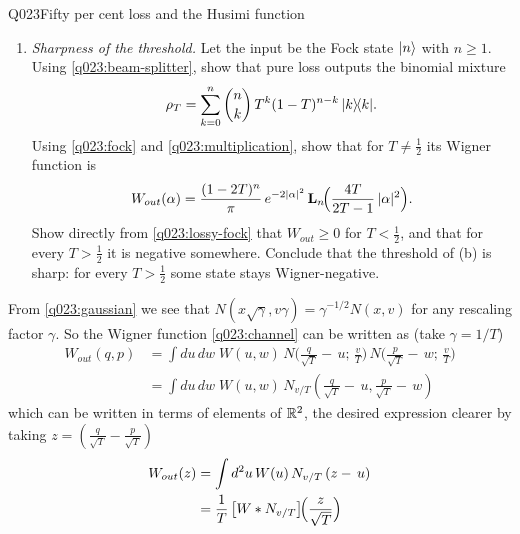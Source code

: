 \begin{entry}{Q023}{Fifty per cent loss and the Husimi function}
\begin{problem}
\begin{enumerate}[label=\textbf{(\alph*)},leftmargin=*]
  \item \emph{Sharpness of the threshold.} Let the input be the Fock state $\lvert n \rangle$ with
        $n\ge1$. Using \eqref{q023:beam-splitter}, show that pure loss outputs the
        binomial mixture
        \begin{equation}
          \rho_T=\sum_{k=0}^{n}\binom nk\,T^{k}(1-T)^{n-k}\,\lvert k \rangle\!\langle k \rvert .
          \label{q023:binomial}
        \end{equation}
        Using \eqref{q023:fock} and \eqref{q023:multiplication}, show that for
        $T\neq\tfrac12$ its Wigner function is
        \begin{equation}
          W_{ out}(\alpha)=\frac{(1-2T)^{n}}{\pi}\,e^{-2|\alpha|^{2}}\,
          \mathbf L_{n}\!\Bigl(\frac{4T}{2T-1}\,|\alpha|^{2}\Bigr).
          \label{q023:lossy-fock}
        \end{equation}
        Show directly from \eqref{q023:lossy-fock} that $W_{ out}\ge0$ for
        $T<\tfrac12$, and that for every $T>\tfrac12$ it is negative somewhere. Conclude
        that the threshold of (b) is sharp: for every $T>\tfrac12$ some state stays
        Wigner-negative.

  
\end{enumerate}
\end{problem}


\begin{solution}[Part (a)]
From \eqref{q023:gaussian} we see that $N(x\sqrt{\gamma},v\gamma)=\gamma^{-1/2}N(x,v)$ for any rescaling factor $\gamma$. So the Wigner function \eqref{q023:channel} can be written as (take $\gamma=1/T$)
\begin{equation}
\begin{split}
     W_{ out}(q,p)&=\int du\,dw\;W(u,w)\,N\bigl(\frac{q}{\sqrt{T}}-\,u;\,\frac{v}{T}\bigr)\,N\bigl(\frac{p}{\sqrt{T}}-\,w;\,\frac{v}{T}\bigr)\\
     &=\int du\,dw\;W(u,w)\,N_{v/T}\left( \frac{q}{\sqrt{T}}-\,u, \frac{p}{\sqrt{T}}-\,w\right)
\end{split}
\end{equation}
which can be written in terms of elements of $\mathbb{R}^2$, the desired expression clearer by taking $z=\left(\frac{q}{\sqrt{T}}-\frac{p}{\sqrt{T}} \right)$
\begin{equation}
\begin{split}
     W_{ out}(z)&= \int d^2u\, W(u)\,N_{v/T}\left( z-\,u\right)\\
     &= \frac1T\,\bigl[W*N_{v/T}\bigr]\!\Bigl(\frac{z}{\sqrt T}\Bigr)
\end{split}
\end{equation}


\end{solution}
\end{entry}
